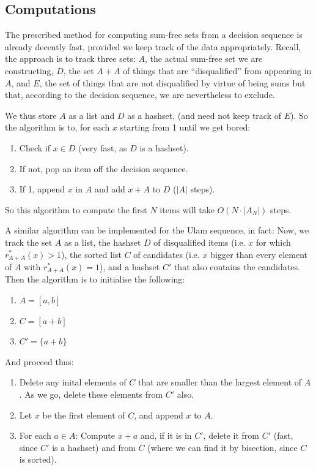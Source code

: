 \documentclass{report}
\theoremstyle{remark}
\numberwithin{equation}{section}
\begin{document}
\subsection{Computations}

The prescribed method for computing sum-free sets from a decision
sequence is already decently fast, provided we keep track of the data
appropriately.  Recall, the approach is to track three sets: $A$, the
actual sum-free set we are constructing, $D$, the set $A+A$ of things
that are ``disqualified'' from appearing in $A$, and $E$, the set of
things that are not disqualified by virtue of being sums but that,
according to the decision sequence, we are nevertheless to exclude.

We thus store $A$ as a list and $D$ as a hashset, (and need not keep
track of $E$).  So the algorithm is to, for each $x$ starting from 1
until we get bored:

\begin{enumerate}
\item Check if $x \in D$ (very fast, as $D$ is a hashset).  
\item If not, pop an item off the decision sequence.  
\item If 1, append $x$ in $A$ and add $x + A$ to $D$ ($|A|$ steps).
\end{enumerate}

So this algorithm to compute the first $N$ items will take
$O(N \cdot |A_N|)$ steps.

A similar algorithm can be implemented for the Ulam sequence, in fact:
Now, we track the set $A$ as a list, the hashset $D$ of disqualified
items (i.e. $x$ for which $r^*_{A+A}(x) > 1$), the sorted list $C$ of
candidates (i.e. $x$ bigger than every element of $A$ with
$r^*_{A+A}(x) = 1$), and a hashset $C'$ that also contains the candidates.  Then the algorithm is to initialise the
following: 

\begin{enumerate}
\item $A = [a,b]$
\item $C = [a+b]$
\item $C' = \{a+b\}$
\end{enumerate}

And proceed thus: 

\begin{enumerate}
\item Delete any inital elements of $C$ that are smaller than the
  largest element of $A$.  As we go, delete these elements from $C'$
  also.
\item Let $x$ be the first element of $C$, and append $x$ to $A$.
\item For each $a \in A$: Compute $x + a$ and, if it is in $C'$,
  delete it from $C'$ (fast, since $C'$ is a hashset) and from $C$
  (where we can find it by bisection, since $C$ is sorted).
\end{enumerate}
\end{document}

